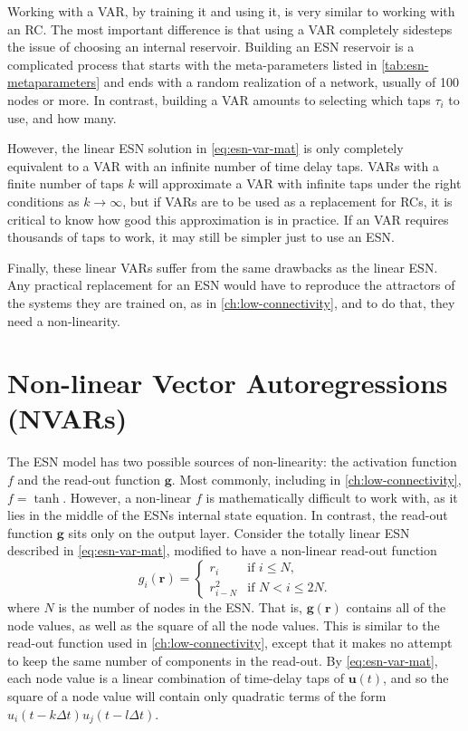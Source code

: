 Working with a VAR, by training it and using it, is very similar to
working with an RC. The most important difference is that using a VAR
completely sidesteps the issue of choosing an internal
reservoir. Building an ESN reservoir is a complicated process that
starts with the meta-parameters listed in \cref{tab:esn-metaparameters}
and ends with a random realization of a network, usually of 100 nodes
or more. In contrast, building a VAR amounts to selecting which taps
$\tau_i$ to use, and how many.

However, the linear ESN solution in \cref{eq:esn-var-mat} is only
completely equivalent to a VAR with an infinite number of time delay
taps. VARs with a finite number of taps $k$ will approximate a VAR
with infinite taps under the right conditions as $k \rightarrow
\infty$\cite{bollt2021}, but if VARs are to be used as a replacement
for RCs, it is critical to know how good this approximation is in
practice. If an VAR requires thousands of taps to work, it may still
be simpler just to use an ESN.

Finally, these linear VARs suffer from the same drawbacks as the
linear ESN. Any practical replacement for an ESN would have to
reproduce the attractors of the systems they are trained on, as in
\cref{ch:low-connectivity}, and to do that, they need a non-linearity.

\section{Non-linear Vector Autoregressions (NVARs)}

The ESN model has two possible sources of non-linearity: the
activation function $f$ and the read-out function $\bm{g}$. Most
commonly, including in \cref{ch:low-connectivity}, $f =
\tanh$. However, a non-linear $f$ is mathematically difficult to work
with, as it lies in the middle of the ESNs internal state equation. In
contrast, the read-out function $\bm{g}$ sits only on the output
layer. Consider the totally linear ESN described in
\cref{eq:esn-var-mat}, modified to have a non-linear read-out function
\begin{equation}
  g_i(\bm{r}) = \begin{cases}
    r_i & \text{if } i \leq N, \\
    r_{i - N}^2 & \text{if } N < i \leq 2N.
  \end{cases}
  \label{eq:esn-quadratic-out}
\end{equation}
where $N$ is the number of nodes in the ESN.  That is,
$\bm{g}(\bm{r})$ contains all of the node values, as well as the
square of all the node values. This is similar to the read-out
function used in \cref{ch:low-connectivity}, except that it makes no
attempt to keep the same number of components in the read-out. By
\cref{eq:esn-var-mat}, each node value is a linear combination of
time-delay taps of $\bm{u}(t)$, and so the square of a node value will
contain only quadratic terms of the form $u_i(t-k\Delta
t)u_j(t-l\Delta t)$.

